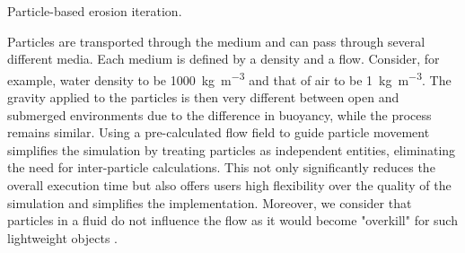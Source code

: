\begin{algorithm}[H]
    \caption{Particle-based erosion iteration.}
    \label{alg:erosion-main-loop}
    \DontPrintSemicolon
    \BlankLine

    \Return{$\Tilde{\Terrain}$}
\end{algorithm}



Particles are transported through the medium and can pass through several different media. Each medium is defined by a density and a flow. Consider, for example, water density to be \SI{1000}{\kilogram \per \cubic \meter} and that of air to be \SI{1}{\kilogram \per \cubic \meter}. The gravity applied to the particles is then very different between open and submerged environments due to the difference in buoyancy, while the process remains similar.
Using a pre-calculated flow field to guide particle movement simplifies the simulation by treating particles as independent entities, eliminating the need for inter-particle calculations. This not only significantly reduces the overall execution time but also offers users high flexibility over the quality of the simulation and simplifies the implementation. Moreover, we consider that particles in a fluid do not influence the flow as it would become "overkill" for such lightweight objects \cite{Wei2003}.


